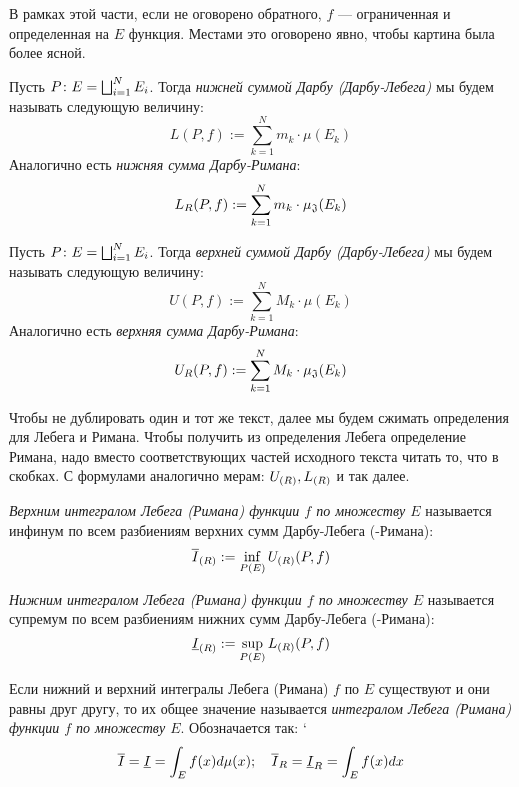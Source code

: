 \begin{note}
	В рамках этой части, если не оговорено обратного, $f$ --- ограниченная и определенная на $E$ функция. Местами это оговорено явно, чтобы картина была более ясной.
\end{note}

\begin{definition}
	Пусть $P \colon E = \bigsqcup_{i = 1}^N E_i$. Тогда \textit{нижней суммой Дарбу (Дарбу-Лебега)} мы будем называть следующую величину:
	\[
		L(P, f) := \sum_{k = 1}^N m_k \cdot \mu(E_k)
	\]
	Аналогично есть \textit{нижняя сумма Дарбу-Римана}:
	\[
		L_R(P, f) := \sum_{k = 1}^N m_k \cdot \operatorname{\mu_\mathfrak{J}}(E_k)
	\]
\end{definition}

\begin{definition}
	Пусть $P \colon E = \bigsqcup_{i = 1}^N E_i$. Тогда \textit{верхней суммой Дарбу (Дарбу-Лебега)} мы будем называть следующую величину:
	\[
	U(P, f) := \sum_{k = 1}^N M_k \cdot \mu(E_k)
	\]
	Аналогично есть \textit{верхняя сумма Дарбу-Римана}:
	\[
	U_R(P, f) := \sum_{k = 1}^N M_k \cdot \operatorname{\mu_\mathfrak{J}}(E_k)
	\]
\end{definition}

\begin{note}
	Чтобы не дублировать один и тот же текст, далее мы будем сжимать определения для Лебега и Римана. Чтобы получить из определения Лебега определение Римана, надо вместо соответствующих частей исходного текста читать то, что в скобках. С формулами аналогично мерам: $U_{(R)}, L_{(R)}$ и так далее.
\end{note}

\begin{definition}
	\textit{Верхним интегралом Лебега (Римана) функции $f$ по множеству $E$} называется инфинум по всем разбиениям верхних сумм Дарбу-Лебега (-Римана):
	\[
		\overline{I}_{(R)} := \inf_{P(E)} U_{(R)}(P, f)
	\]
\end{definition}

\begin{definition}
	\textit{Нижним интегралом Лебега (Римана) функции $f$ по множеству $E$} называется супремум по всем разбиениям нижних сумм Дарбу-Лебега (-Римана):
	\[
		\underline{I}_{(R)} := \sup_{P(E)} L_{(R)}(P, f)
	\]
\end{definition}

\begin{definition}
	Если нижний и верхний интегралы Лебега (Римана) $f$ по $E$ существуют и они равны друг другу, то их общее значение называется \textit{интегралом Лебега (Римана) функции $f$ по множеству $E$}. Обозначается так:
`	\[
		\overline{I} = \underline{I} = \int_E f(x) d\mu(x); \quad \overline{I}_R = \underline{I}_R = \int_E f(x)dx
	\]
\end{definition}

